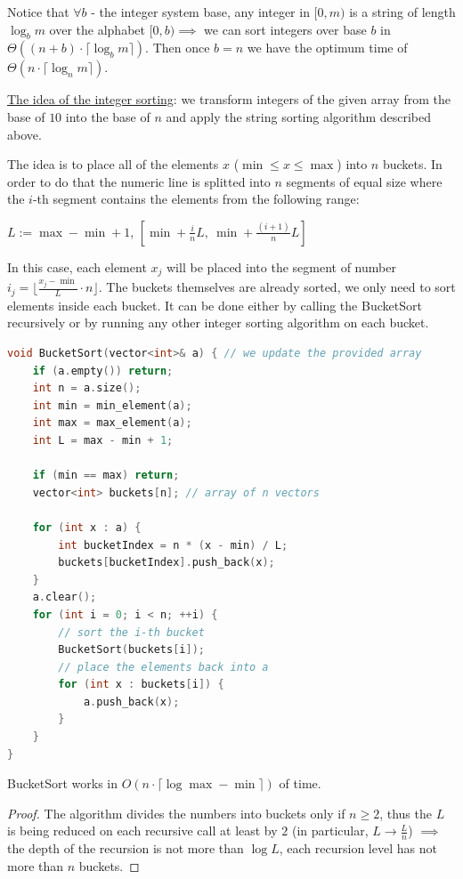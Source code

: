 Notice that $\forall b$ - the integer system base, any integer in $[0, m)$ is a string of length $\log_{b}{m}$ over the alphabet $[0, b) \implies$ we can sort integers over base $b$ in $\Theta((n + b) \cdot \lceil \log_{b}{m} \rceil)$. Then once $b = n$ we have the optimum time of $\Theta(n \cdot \lceil \log_{n}{m} \rceil)$.

\underline{The idea of the integer sorting}: we transform integers of the given array from the base of $10$ into the base of $n$ and apply the string sorting algorithm described above.



The idea is to place all of the elements $x$ ($\min \leq x \leq \max$) into $n$ buckets. In order to do that the numeric line is splitted into $n$ segments of equal size where the $i$-th segment contains the elements from the following range:

$L := \max - \min + 1$, $[\min + \frac{i}{n}L, \ \min + \frac{(i+1)}{n}L]$

In this case, each element $x_j$ will be placed into the segment of number $i_j = \lfloor \frac{x_j - \min}{L} \cdot n \rfloor$. The buckets themselves are already sorted, we only need to sort elements inside each bucket. It can be done either by calling the BucketSort recursively or by running any other integer sorting algorithm on each bucket.

\begin{lstlisting}[language=C++]
void BucketSort(vector<int>& a) { // we update the provided array
    if (a.empty()) return;
    int n = a.size();
    int min = min_element(a);
    int max = max_element(a);
    int L = max - min + 1;

    if (min == max) return;
    vector<int> buckets[n]; // array of n vectors

    for (int x : a) {
        int bucketIndex = n * (x - min) / L;
        buckets[bucketIndex].push_back(x);
    }
    a.clear();
    for (int i = 0; i < n; ++i) {
        // sort the i-th bucket
        BucketSort(buckets[i]);
        // place the elements back into a
        for (int x : buckets[i]) {
            a.push_back(x);
        }
    }
}
\end{lstlisting}

\begin{lemma}
    BucketSort works in $O(n \cdot \lceil \log{\max - \min} \rceil)$ of time.
\end{lemma}

\begin{proof}
    The algorithm divides the numbers into buckets only if $n \geq 2$, thus the $L$ is being reduced on each recursive call at least by $2$ (in particular, $L \to \frac{L}{n}$) $\implies$ the depth of the recursion is not more than $\log{L}$, each recursion level has not more than $n$ buckets.
\end{proof}